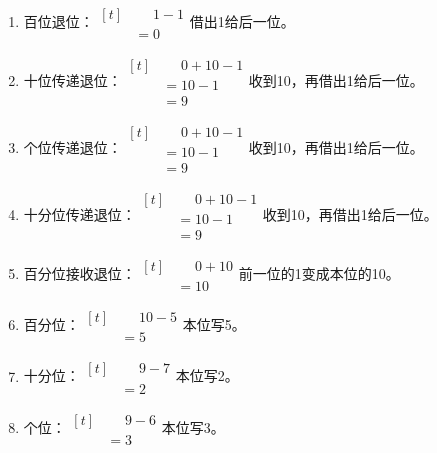 {\begin{tikzpicture}[x=1em,y=1em,baseline=(current bounding box.center),draw=answerred,text=answerred]
\end{tikzpicture}
\par{}
\vspace{0pt}
\begin{enumerate}[leftmargin=1.7em,itemsep=5pt,topsep=0pt]
\item 百位退位：\(\begin{aligned}[t]&\phantom{={}}1-1\\&=0\end{aligned}\)\quad 借出1给后一位。
\item 十位传递退位：\(\begin{aligned}[t]&\phantom{={}}0+10-1\\&=10-1\\&=9\end{aligned}\)\quad 收到10，再借出1给后一位。
\item 个位传递退位：\(\begin{aligned}[t]&\phantom{={}}0+10-1\\&=10-1\\&=9\end{aligned}\)\quad 收到10，再借出1给后一位。
\item 十分位传递退位：\(\begin{aligned}[t]&\phantom{={}}0+10-1\\&=10-1\\&=9\end{aligned}\)\quad 收到10，再借出1给后一位。
\item 百分位接收退位：\(\begin{aligned}[t]&\phantom{={}}0+10\\&=10\end{aligned}\)\quad 前一位的1变成本位的10。
\item 百分位：\(\begin{aligned}[t]&\phantom{={}}10-5\\&=5\end{aligned}\)\quad 本位写5。
\item 十分位：\(\begin{aligned}[t]&\phantom{={}}9-7\\&=2\end{aligned}\)\quad 本位写2。
\item 个位：\(\begin{aligned}[t]&\phantom{={}}9-6\\&=3\end{aligned}\)\quad 本位写3。

\end{enumerate}}
